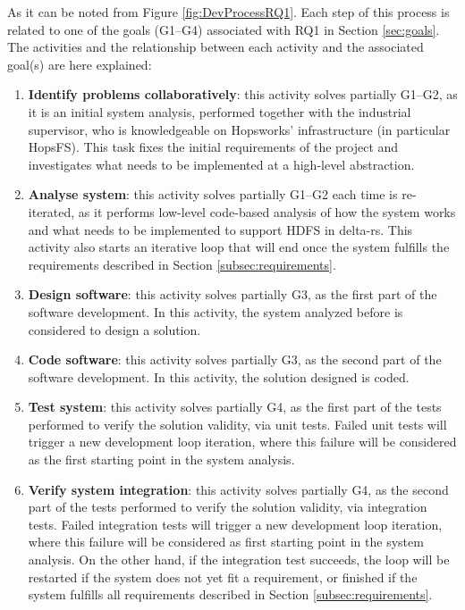As it can be noted from Figure \ref{fig:DevProcessRQ1}. Each step of this process is related to one of the goals (G1--G4) associated with RQ1 in Section \ref{sec:goals}.
The activities and the relationship between each activity and the associated goal(s) are here explained:
\begin{enumerate}
    \item \textbf{Identify problems collaboratively}: this activity solves partially G1--G2, as it is an initial system analysis, performed together with the industrial supervisor, who is knowledgeable on Hopsworks' infrastructure (in particular \gls{HopsFS}). This task fixes the initial requirements of the project and investigates what needs to be implemented at a high-level abstraction.
    \item \textbf{Analyse system}: this activity solves partially G1--G2 each time is re-iterated, as it performs low-level code-based analysis of how the system works and what needs to be implemented to support \gls{HDFS} in delta-rs. This activity also starts an iterative loop that will end once the system fulfills the requirements described in Section \ref{subsec:requirements}.
    \item \textbf{Design software}: this activity solves partially G3, as the first part of the software development. In this activity, the system analyzed before is considered to design a solution.
    \item \textbf{Code software}: this activity solves partially G3, as the second part of the software development. In this activity, the solution designed is coded.
    \item \textbf{Test system}: this activity solves partially G4, as the first part of the tests performed to verify the solution validity, via unit tests. Failed unit tests will trigger a new development loop iteration, where this failure will be considered as the first starting point in the system analysis.
    \item \textbf{Verify system integration}: this activity solves partially G4, as the second part of the tests performed to verify the solution validity, via integration tests. Failed integration tests will trigger a new development loop iteration, where this failure will be considered as first starting point in the system analysis. On the other hand, if the integration test succeeds, the loop will be restarted if the system does not yet fit a requirement, or finished if the system fulfills all requirements described in Section \ref{subsec:requirements}.
\end{enumerate}

